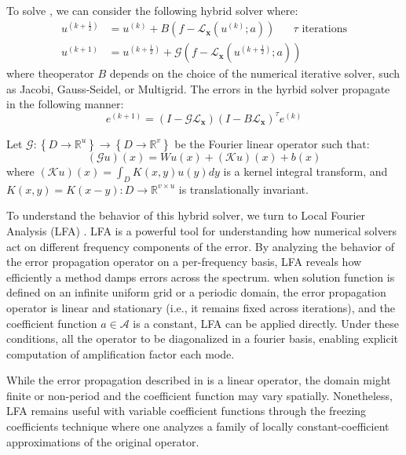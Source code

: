\documentclass[12pt]{article}
\begin{document}
To solve , we can consider the following hybrid solver where:
\begin{align*}
    u^{\left(k + \frac{1}{2}\right)} &= u^{\left(k \right)} + B(f - \mathcal{L}_{\mathbf{x}}\left(u^{\left(k \right)}; a\right)) \quad \text{ $\tau$ iterations}\\
    u^{\left(k + 1\right)} &= u^{\left(k + \frac{1}{2}\right)} + \mathcal{G}\left(f - \mathcal{L}_{\mathbf{x}}\left(u^{\left(k + \frac{1}{2}\right)}; a\right)\right)
\end{align*}
where theoperator $B$ depends on the choice of the numerical iterative solver, such as Jacobi, Gauss-Seidel, or Multigrid. The errors in the hyrbid solver propagate in the following manner:
\begin{equation}
    e^{(k+1)} = \left(I - \mathcal{G} \mathcal{L}_{\mathbf{x}}\right)\left(I - B \mathcal{L}_{\mathbf{x}}\right)^{\tau}e^{(k)} \label{eq:errorhybrid}
\end{equation}


Let $\mathcal{G}: \left\{D \to \mathbb{R}^u\right\} \to \left\{D \to \mathbb{R}^v\right\}$ be the Fourier linear operator such that:
$$\left(\mathcal{G}u\right)(x) = Wu(x) + (\mathcal{K}u)(x) + b(x)$$
where $(\mathcal{K}u)(x) =  \int_{D}K(x, y)u(y)dy$ is a kernel integral transform, and $K(x, y) = K(x - y): D \to \mathbb{R}^{v \times u}$ is translationally invariant. 

To understand the behavior of this hybrid solver, we turn to Local Fourier Analysis (LFA) \cite{brandt1977multi}. LFA is a powerful tool for understanding how numerical solvers act on different frequency components of the error. By analyzing the behavior of the error propagation operator on a per-frequency basis, LFA reveals how efficiently a method damps errors across the spectrum. when solution function is defined on an infinite uniform grid or a periodic domain, the error propagation operator is linear and stationary (i.e., it remains fixed across iterations), and the coefficient function $a \in \mathcal{A}$ is a constant, LFA can be applied directly. Under these conditions, all the operator to be diagonalized in a fourier basis, enabling explicit computation of amplification factor each mode. 

While the error propagation described in  is a linear operator, the domain might finite or non-period and the coefficient function may vary spatially. Nonetheless, LFA remains useful with variable coefficient functions through the freezing coefficients technique where one analyzes a family of locally constant-coefficient approximations of the original operator.  
\end{document}
